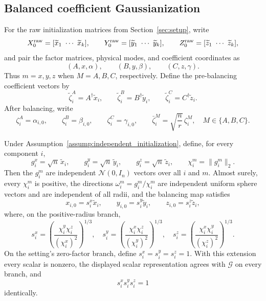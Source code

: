 \subsection{Balanced coefficient Gaussianization}\label{app:step-002}

For the raw initialization matrices from Section~\ref{sec:setup}, write
\[
  X_0^{\rm raw}=[\widetilde x_1\ \cdots\ \widetilde x_k],
  \qquad
  Y_0^{\rm raw}=[\widetilde y_1\ \cdots\ \widetilde y_k],
  \qquad
  Z_0^{\rm raw}=[\widetilde z_1\ \cdots\ \widetilde z_k],
\]
and pair the factor matrices, physical modes, and coefficient coordinates as
\[
  (A,x,\alpha),\qquad (B,y,\beta),\qquad (C,z,\gamma).
\]
Thus \(m=x,y,z\) when \(M=A,B,C\), respectively.
Define the pre-balancing coefficient vectors by
\[
  \widetilde\zeta_i^A=A^\dagger\widetilde x_i,
  \qquad
  \widetilde\zeta_i^B=B^\dagger\widetilde y_i,
  \qquad
  \widetilde\zeta_i^C=C^\dagger\widetilde z_i.
\]
After balancing, write
\[
  \zeta_i^A=\alpha_{i,0},
  \qquad
  \zeta_i^B=\beta_{i,0},
  \qquad
  \zeta_i^C=\gamma_{i,0},
  \qquad
  \bar\zeta_i^M=\sqrt{\frac nr}\,\zeta_i^M,
  \quad M\in\{A,B,C\}.
\]

\begin{lemma}
\label{lem:step-002-balancing-scalars}
Under Assumption~\ref{assump:independent_initialization}, define, for every
component \(i\),
\[
  g_i^x=\sqrt n\,\widetilde x_i,
  \qquad g_i^y=\sqrt n\,\widetilde y_i,
  \qquad g_i^z=\sqrt n\,\widetilde z_i,
  \qquad \chi_i^m=\|g_i^m\|_2.
\]
Then the \(g_i^m\) are independent \(\mathcal N(0,I_n)\) vectors over all
\(i\) and \(m\). Almost surely, every \(\chi_i^m\) is positive, the directions
\(\omega_i^m=g_i^m/\chi_i^m\) are independent uniform sphere vectors and are
independent of all radii, and the balancing map satisfies
\[
  x_{i,0}=s_i^x\widetilde x_i,\qquad
  y_{i,0}=s_i^y\widetilde y_i,\qquad
  z_{i,0}=s_i^z\widetilde z_i,
\]
where, on the positive-radius branch,
\[
  s_i^x=\left(\frac{\chi_i^y\chi_i^z}{(\chi_i^x)^2}\right)^{1/3},
  \quad
  s_i^y=\left(\frac{\chi_i^x\chi_i^z}{(\chi_i^y)^2}\right)^{1/3},
  \quad
  s_i^z=\left(\frac{\chi_i^x\chi_i^y}{(\chi_i^z)^2}\right)^{1/3}.
\]
On the setting's zero-factor branch, define
\(s_i^x=s_i^y=s_i^z=1\). With this extension every scalar is nonzero, the
displayed scalar representation agrees with \(\mathcal G\) on every branch,
and
\[
  s_i^x s_i^y s_i^z=1
\]
identically.

\end{lemma}

